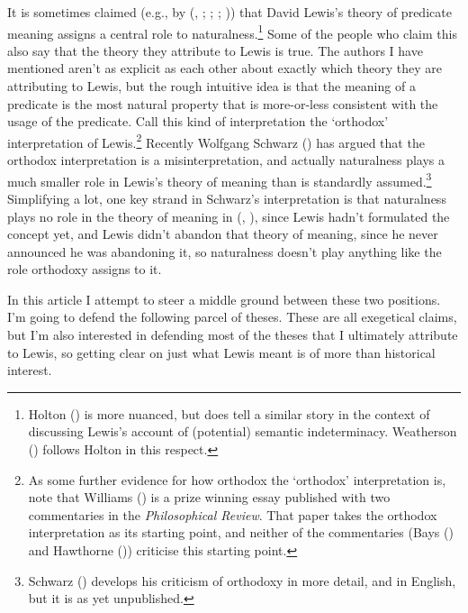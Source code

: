 \documentclass[
  10pt,
  letterpaper,
  DIV=11,
  numbers=noendperiod,
  twoside]{scrartcl}
\begin{document}
It is sometimes claimed (e.g., by (, ;
;
;
)) that David
Lewis's theory of predicate meaning assigns a central role to
naturalness.\footnote{Holton () is
  more nuanced, but does tell a similar story in the context of
  discussing Lewis's account of (potential) semantic indeterminacy.
  Weatherson () follows Holton in
  this respect.} Some of the people who claim this also say that the
theory they attribute to Lewis is true. The authors I have mentioned
aren't as explicit as each other about exactly which theory they are
attributing to Lewis, but the rough intuitive idea is that the meaning
of a predicate is the most natural property that is more-or-less
consistent with the usage of the predicate. Call this kind of
interpretation the `orthodox' interpretation of Lewis.\footnote{As some
  further evidence for how orthodox the `orthodox' interpretation is,
  note that Williams () is a prize
  winning essay published with two commentaries in the
  \emph{Philosophical Review}. That paper takes the orthodox
  interpretation as its starting point, and neither of the commentaries
  (Bays () and Hawthorne
  ()) criticise this starting point.}
Recently Wolfgang Schwarz () has
argued that the orthodox interpretation is a misinterpretation, and
actually naturalness plays a much smaller role in Lewis's theory of
meaning than is standardly assumed.\footnote{Schwarz
  () develops his criticism of orthodoxy
  in more detail, and in English, but it is as yet unpublished.}
Simplifying a lot, one key strand in Schwarz's interpretation is that
naturalness plays no role in the theory of meaning in
(,
), since Lewis hadn't formulated the
concept yet, and Lewis didn't abandon that theory of meaning, since he
never announced he was abandoning it, so naturalness doesn't play
anything like the role orthodoxy assigns to it.

In this article I attempt to steer a middle ground between these two
positions. I'm going to defend the following parcel of theses. These are
all exegetical claims, but I'm also interested in defending most of the
theses that I ultimately attribute to Lewis, so getting clear on just
what Lewis meant is of more than historical interest.
\end{document}
